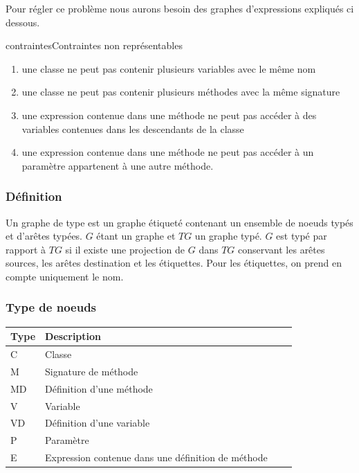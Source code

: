 \documentclass[a4paper, 12pt]{article}
\begin{document}
  Pour régler ce problème nous aurons besoin des graphes d'expressions expliqués ci dessous.\label{subsec:grapheExpression}


  \begin{myfig}{contraintes}{Contraintes non représentables}
    \begin{enumerate}
      \item {\scriptsize une classe ne peut pas contenir plusieurs variables avec le même nom}
      \item {\scriptsize une classe ne peut pas contenir plusieurs méthodes avec la même signature}
      \item {\scriptsize une expression contenue dans une méthode ne peut pas accéder à des variables contenues dans les descendants de la classe}
      \item {\scriptsize une expression contenue dans une méthode ne peut pas accéder à un paramètre appartenent à une autre méthode.}
    \end{enumerate}
  \end{myfig}

  \subsubsection{Définition}
  Un graphe de type est un graphe étiqueté contenant un ensemble de noeuds typés et d'arêtes typées. \(G\) étant un graphe et \(TG\) un graphe typé. \(G\) est typé par rapport à \(TG\) si il existe une projection
  de \(G\) dans \(TG\) conservant les arêtes sources, les arêtes destination et les étiquettes. Pour les étiquettes, on prend en compte uniquement le nom.

  \subsubsection{Type de noeuds}

  \begin{tabular}{ | l | l | l | p{5cm} |}
    \hline
    Type & Description  \\ \hline
    C & Classe   \\ \hline
    M & Signature de méthode   \\ \hline
    MD &  Définition d'une méthode   \\ \hline
    V &  Variable   \\ \hline
    VD &  Définition d'une variable \\ \hline
    P & Paramètre \\ \hline
    E &  Expression contenue dans une définition de méthode \\ \hline
  \end{tabular}
\end{document}

